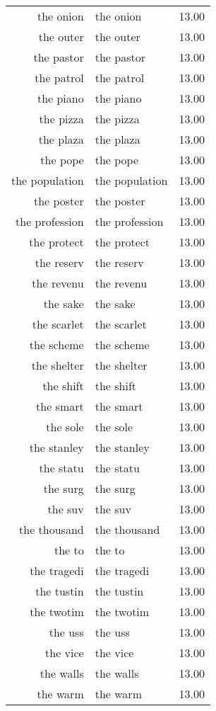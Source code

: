 \begin{table}[ht]
\begin{tabular}{rlr}
  the onion & the onion & 13.00 \\ 
  the outer & the outer & 13.00 \\ 
  the pastor & the pastor & 13.00 \\ 
  the patrol & the patrol & 13.00 \\ 
  the piano & the piano & 13.00 \\ 
  the pizza & the pizza & 13.00 \\ 
  the plaza & the plaza & 13.00 \\ 
  the pope & the pope & 13.00 \\ 
  the population & the population & 13.00 \\ 
  the poster & the poster & 13.00 \\ 
  the profession & the profession & 13.00 \\ 
  the protect & the protect & 13.00 \\ 
  the reserv & the reserv & 13.00 \\ 
  the revenu & the revenu & 13.00 \\ 
  the sake & the sake & 13.00 \\ 
  the scarlet & the scarlet & 13.00 \\ 
  the scheme & the scheme & 13.00 \\ 
  the shelter & the shelter & 13.00 \\ 
  the shift & the shift & 13.00 \\ 
  the smart & the smart & 13.00 \\ 
  the sole & the sole & 13.00 \\ 
  the stanley & the stanley & 13.00 \\ 
  the statu & the statu & 13.00 \\ 
  the surg & the surg & 13.00 \\ 
  the suv & the suv & 13.00 \\ 
  the thousand & the thousand & 13.00 \\ 
  the to & the to & 13.00 \\ 
  the tragedi & the tragedi & 13.00 \\ 
  the tustin & the tustin & 13.00 \\ 
  the twotim & the twotim & 13.00 \\ 
  the uss & the uss & 13.00 \\ 
  the vice & the vice & 13.00 \\ 
  the walls & the walls & 13.00 \\ 
  the warm & the warm & 13.00 \\ 

\end{tabular}
\end{table}
